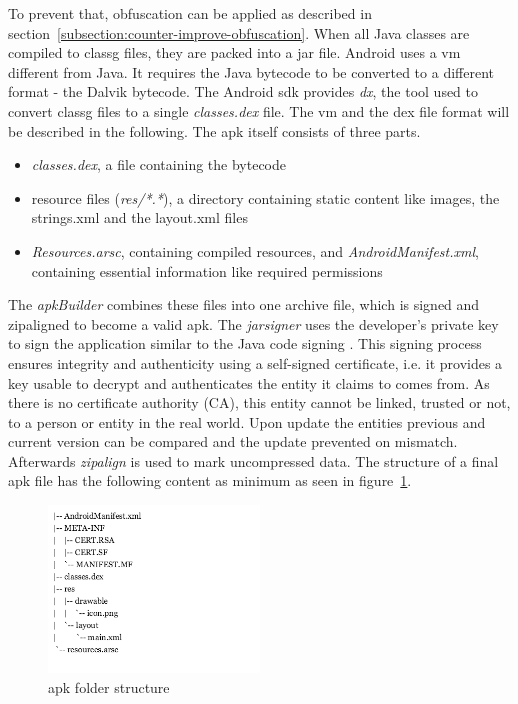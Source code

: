 To prevent that, obfuscation can be applied as described in section~\ref{subsection:counter-improve-obfuscation}.
When all Java classes are compiled to \gls{classg} files, they are packed into a \gls{jar} file.
\newline
Android uses a \gls{vm} different from Java.
It requires the Java bytecode to be converted to a different format - the Dalvik bytecode.
The Android \gls{sdk} provides \textit{dx}, the tool used to convert \gls{classg} files to a single \textit{classes.dex} file.
The \gls{vm} and the \gls{dex} file format will be described in the following.
\newline
The \gls{apk} itself consists of three parts.
\begin{itemize}
\item \textit{classes.dex}, a file containing the bytecode
\item resource files (\textit{res/*.*}), a directory containing static content like images, the strings.xml and the layout.xml files
\item \textit{Resources.arsc}, containing compiled resources, and \textit{AndroidManifest.xml}, containing essential information like required permissions
\end{itemize}
The \textit{apkBuilder} combines these files into one archive file, which is signed and zipaligned to become a valid \gls{apk}.
The \textit{jarsigner} uses the developer’s private key to sign the application similar to the Java code signing \cite{codeSigning}.
This signing process ensures integrity and authenticity using a self-signed certificate, i.e. it provides a key usable to decrypt and authenticates the entity it claims to comes from.
As there is no certificate authority (CA), this entity cannot be linked, trusted or not, to a person or entity in the real world.
Upon update the entities previous and current version can be compared and the update prevented on mismatch. \cite{nelenkovSelf}
Afterwards \textit{zipalign} is used to mark uncompressed data. \cite{androidPublishSign} \cite{androidSigning} \cite{andevconDalvikART}
\newline
\newline
The structure of a final \gls{apk} file has the following content as minimum as seen in figure~\ref{fig:apkfolder}.
\begin{figure}[h]
    \centering
    \includegraphics[width=0.5\textwidth]{data/apkfolder.png}
    \caption{\gls{apk} folder structure}
    \label{fig:apkfolder}
\end{figure}
